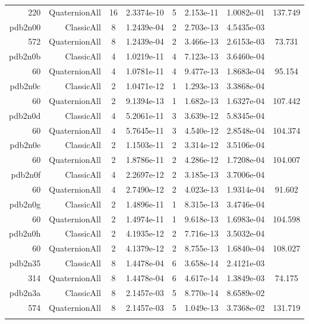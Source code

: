 \begin{xltabular}{\textwidth}{r|rcS[table-format=1.4e+2]cS[table-format=1.3e+2]S[table-format=1.4e+2]S[table-format=-1.3]}
220 & QuaternionAll & 16 & 2.3374e-10 & 5 & 2.153e-11 & 1.0082e-01 & 137.749\\  \addlinespace
pdb2n00 & ClassicAll & 8 & 1.2439e-04 & 2 & 2.703e-13 & 4.5435e-03 & \\
572 & QuaternionAll & 8 & 1.2439e-04 & 2 & 3.466e-13 & 2.6153e-03 & 73.731\\  \addlinespace
pdb2n0b & ClassicAll & 4 & 1.0219e-11 & 4 & 7.123e-13 & 3.6460e-04 & \\
60 & QuaternionAll & 4 & 1.0781e-11 & 4 & 9.477e-13 & 1.8683e-04 & 95.154\\  \addlinespace
pdb2n0c & ClassicAll & 2 & 1.0471e-12 & 1 & 1.293e-13 & 3.3868e-04 & \\
60 & QuaternionAll & 2 & 9.1394e-13 & 1 & 1.682e-13 & 1.6327e-04 & 107.442\\  \addlinespace
pdb2n0d & ClassicAll & 4 & 5.2061e-11 & 3 & 3.639e-12 & 5.8345e-04 & \\
60 & QuaternionAll & 4 & 5.7645e-11 & 3 & 4.540e-12 & 2.8548e-04 & 104.374\\  \addlinespace
pdb2n0e & ClassicAll & 2 & 1.1503e-11 & 2 & 3.314e-12 & 3.5106e-04 & \\
60 & QuaternionAll & 2 & 1.8786e-11 & 2 & 4.286e-12 & 1.7208e-04 & 104.007\\  \addlinespace
pdb2n0f & ClassicAll & 4 & 2.2697e-12 & 2 & 3.185e-13 & 3.7006e-04 & \\
60 & QuaternionAll & 4 & 2.7490e-12 & 2 & 4.023e-13 & 1.9314e-04 & 91.602\\  \addlinespace
pdb2n0g & ClassicAll & 2 & 1.4896e-11 & 1 & 8.315e-13 & 3.4746e-04 & \\
60 & QuaternionAll & 2 & 1.4974e-11 & 1 & 9.618e-13 & 1.6983e-04 & 104.598\\  \addlinespace
pdb2n0h & ClassicAll & 2 & 4.1935e-12 & 2 & 7.716e-13 & 3.5032e-04 & \\
60 & QuaternionAll & 2 & 4.1379e-12 & 2 & 8.755e-13 & 1.6840e-04 & 108.027\\  \addlinespace
pdb2n35 & ClassicAll & 8 & 1.4478e-04 & 6 & 3.658e-14 & 2.4121e-03 & \\
314 & QuaternionAll & 8 & 1.4478e-04 & 6 & 4.617e-14 & 1.3849e-03 & 74.175\\  \addlinespace
pdb2n3a & ClassicAll & 8 & 2.1457e-03 & 5 & 8.770e-14 & 8.6589e-02 & \\
574 & QuaternionAll & 8 & 2.1457e-03 & 5 & 1.049e-13 & 3.7368e-02 & 131.719\\  \addlinespace

\end{xltabular}
